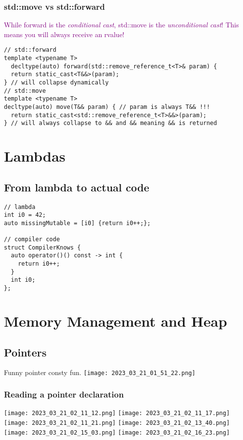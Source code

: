 \documentclass[main.tex,fontsize=8pt,paper=a4,paper=portrait,DIV=calc,]{scrartcl}
\begin{document}
\subsubsection{std::move vs std::forward}
\textcolor{purple}{While forward is the \emph{conditional cast}, std::move is the \emph{unconditional cast}! This means you will always receive an rvalue!}
\begin{lstlisting}
// std::forward
template <typename T>
  decltype(auto) forward(std::remove_reference_t<T>& param) {
  return static_cast<T&&>(param); 
} // will collapse dynamically
// std::move
template <typename T>
decltype(auto) move(T&& param) { // param is always T&& !!!
  return static_cast<std::remove_reference_t<T>&&>(param);
} // will always collapse to && and && meaning && is returned
\end{lstlisting}

\section{Lambdas}

\subsection{From lambda to actual code}
\begin{lstlisting}
// lambda
int i0 = 42;
auto missingMutable = [i0] {return i0++;};

// compiler code
struct CompilerKnows {
  auto operator()() const -> int {
    return i0++;
  }
  int i0;
};
\end{lstlisting}

\section{Memory Management and Heap}

\subsection{Pointers}
Funny pointer consty fun.\newline
\texttt{[image: 2023\_03\_21\_01\_51\_22.png]}

\subsubsection{Reading a pointer declaration}
\texttt{[image: 2023\_03\_21\_02\_11\_12.png]}
\texttt{[image: 2023\_03\_21\_02\_11\_17.png]}
\texttt{[image: 2023\_03\_21\_02\_11\_21.png]}\newline
\texttt{[image: 2023\_03\_21\_02\_13\_40.png]}\newline
\texttt{[image: 2023\_03\_21\_02\_15\_03.png]}
\texttt{[image: 2023\_03\_21\_02\_16\_23.png]}
\end{document}
